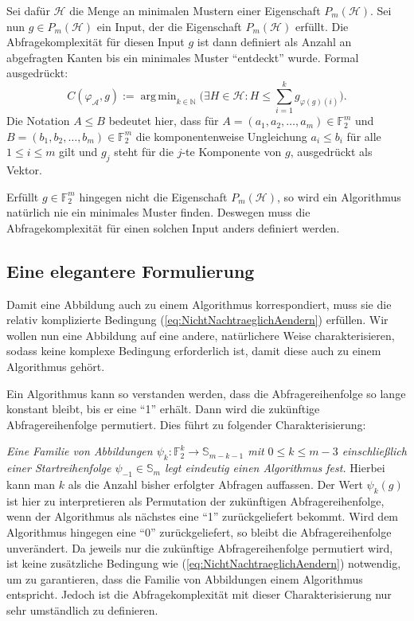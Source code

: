 \documentclass[10pt,a4paper, footheight=1mm]{scrreprt}
\theoremstyle{definition}
\DeclareMathOperator*\argmin{arg\,min}
\begin{document}
Sei dafür $\mathcal{H}$ die Menge an minimalen
Mustern einer Eigenschaft $P_m(\mathcal{H})$.
Sei nun $g\in P_m(\mathcal{H})$ ein Input, der die
Eigenschaft $P_m(\mathcal{H})$ erfüllt.
Die Abfragekomplexität für diesen Input $g$
ist dann definiert als Anzahl an abgefragten Kanten
bis ein minimales Muster "`entdeckt"' wurde.
Formal ausgedrückt:
$$ C(\varphi_\mathcal{A}, g) :=
\argmin_{k\in\mathbb{N}} \Big(\exists H\in\mathcal{H}:
H \leq \sum_{i=1}^k g_{\varphi(g)(i)} \Big).
$$
Die Notation $A\leq B$ bedeutet hier, dass
für $A=(a_1, a_2, \dots, a_m)\in \mathbb{F}_2^m$
und $B=(b_1, b_2, \dots, b_m)\in \mathbb{F}_2^m$
die komponentenweise Ungleichung $a_i \leq b_i$
für alle $1\leq i\leq m$ gilt und $g_j$ steht für
die $j$-te Komponente von $g$, ausgedrückt als
Vektor.

Erfüllt $g\in\mathbb{F}_2^m$ hingegen nicht die
Eigenschaft $P_m(\mathcal{H})$, so wird ein Algorithmus
natürlich nie ein minimales Muster finden. Deswegen
muss die Abfragekomplexität für einen solchen
Input anders definiert werden.

\subsection{Eine elegantere Formulierung}
Damit eine Abbildung auch zu einem Algorithmus
korrespondiert, muss sie die relativ komplizierte
Bedingung (\ref{eq:NichtNachtraeglichAendern})
erfüllen. Wir wollen nun eine Abbildung
auf eine andere, natürlichere
Weise charakterisieren, sodass keine komplexe Bedingung
erforderlich ist, damit diese auch zu einem
Algorithmus gehört.

Ein Algorithmus kann so verstanden werden, dass die
Abfragereihenfolge so lange konstant bleibt, bis er
eine "`1"' erhält. Dann wird die zukünftige Abfragereihenfolge
permutiert. Dies führt zu folgender Charakterisierung:

\emph{Eine Familie von Abbildungen 
$\psi_k:\mathbb{F}_2^k \to \mathbb{S}_{m-k-1}$
mit $0 \leq k \leq m-3$ einschließlich einer Startreihenfolge
$\psi_{-1}\in\mathbb{S}_m$ legt eindeutig einen Algorithmus fest.}
Hierbei kann man $k$ als die Anzahl bisher erfolgter Abfragen
auffassen. Der Wert $\psi_k(g)$ ist hier zu interpretieren
als Permutation der zukünftigen Abfragereihenfolge, wenn
der Algorithmus als nächstes eine "`1"' zurückgeliefert bekommt.
Wird dem Algorithmus hingegen eine "`0"' zurückgeliefert, so
bleibt die Abfragereihenfolge unverändert.
Da jeweils nur die zukünftige Abfragereihenfolge permutiert 
wird, ist keine zusätzliche Bedingung wie 
(\ref{eq:NichtNachtraeglichAendern}) notwendig, um zu garantieren,
dass die Familie von Abbildungen einem Algorithmus entspricht.
Jedoch ist die Abfragekomplexität mit dieser Charakterisierung
nur sehr umständlich zu definieren.
\end{document}
